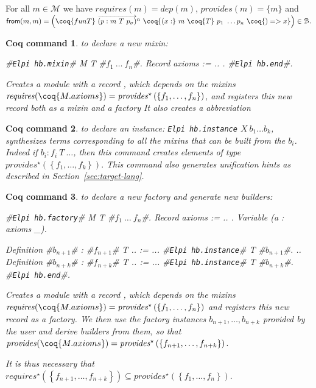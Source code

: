 \documentclass[a4paper,UKenglish,cleveref, autoref]{lipics-v2019}
\newcommand{\mixin}{mixin}
\newcommand{\mixins}{mixins}
\newcommand{\M}{\ensuremath{\mathcal{M}}}
\newcommand{\factory}{factory}
\newcommand{\phantterm}{abbreviation}
\newcommand{\mixinbuilders}{builders}
\newcommand{\factoryinstances}{factory instances}
\newcommand{\F}{\ensuremath{\mathcal{F}}}
\newcommand{\dep}{\ensuremath{\mathit{dep}}}
\newcommand{\B}{\ensuremath{\mathcal{B}}}
\newcommand{\requires}{\ensuremath{\mathit{requires}}}
\newcommand{\provides}{\ensuremath{\mathit{provides}}}
\newcommand{\from}{\ensuremath{\mathsf{from}}}
\newcommand{\set}[1]{\left\{#1\right\}}
\newcommand{\enum}[2]{\ensuremath{\set{#1,\ldots,#2}}}
\newcommand{\vect}[1]{\overrightarrow{#1}}
\newcommand{\pmp}[1]{\ensuremath{\vect{\left(p : m\ T\ p_\sigma\right)}^{#1}}}
\newcommand{\hbmixin}{{\tt\color{dkgreen}Elpi hb.mixin}}
\newcommand{\hbfactory}{{\tt\color{dkgreen}Elpi hb.factory}}
\newcommand{\hbinstance}{{\tt\color{dkgreen}Elpi hb.instance}}
\newcommand{\hbend}{{\tt\color{dkgreen}Elpi hb.end}}
\theoremstyle{implem}
\theoremstyle{implem}
\theoremstyle{command}
\newtheorem*{command}{Coq command}
\begin{document}
\begin{proposition}[\( \M{} \subseteq \F{} \)] For all \(m \in \M{}\)
  we have \(\requires{}(m) = \dep{}(m)\), \(\provides{}(m) = \{m\}\)
  and
  \(\from{}(m,m) = \left(\coq{fun T }\ \pmp{n} \ \coq{(x :}\ m\
  \coq{T }\ p_1\ \ldots p_n\ \coq{) => x}\right) \in \B{}.\)
\end{proposition}


\begin{command} to declare a new mixin:
\begin{coqcode}
#\hbmixin{}# M T #$f_1\ \ldots\ f_n$#. Record axioms := { .. }. #\hbend{}#.
\end{coqcode}
  Creates a module  with a record
  , which depends on the \mixins{}
  \(\requires{}(\coq{M.axioms}) =
  \provides{}^\star\left(\enum{f_1}{f_n}\right)\), and registers this
  new record both as a \mixin{} and a \factory{} It also creates a
  \phantterm{} \coq{M.Axioms}
\end{command}

\begin{command} to declare an instance: \hbinstance{}
  \(X\ b_1 \ldots b_k\), synthesizes terms corresponding to all the
  \mixins{} that can be built from the $b_i$. Indeed if
  \(b_i : f_i\ T\ \ldots\), then this command creates elements of type
  \(\provides{}^\star\left(\enum{f_1}{f_k}\right).\) This command also
  generates unification hints as described in
  Section~\ref{sec:target-lang}.
\end{command}

\begin{command} to declare a new \factory{} and generate new \mixinbuilders:
\begin{coqcode}
#\hbfactory{}# M T #$f_1\ \ldots\ f_n$#.
  Record axioms := { .. }.
  Variable (a : axioms _).

  Definition #$b_{n+1}$# : #$f_{n+1}$# T .. := ...
  #\hbinstance{}# T #$b_{n+1}$#.
  ..
  Definition #$b_{n+k}$# : #$f_{n+k}$# T .. := ...
  #\hbinstance{}# T #$b_{n+k}$#.
#\hbend{}#.
\end{coqcode}
  Creates a module  with a record
  , which depends on the mixins
  \(\requires{}(\coq{M.axioms}) =
  \provides{}^\star\left(\enum{f_1}{f_n}\right)\) and registers this
  new record as a factory. We then use the \factoryinstances{}
  \(b_{n+1}, \ldots, b_{n+k}\) provided by the user and derive
  \mixinbuilders{} from them, so that
  \(\provides{}(\coq{M.axioms}) = \provides{}^\star\left(\enum{f_{n+1}}{f_{n+k}}\right).\)

  It is thus necessary that
  \(\requires{}^\star\left(\enum{f_{n+1}}{f_{n+k}}\right) \subseteq
  \provides{}^\star\left(\enum{f_1}{f_n}\right).\)
\end{command}
\end{document}
